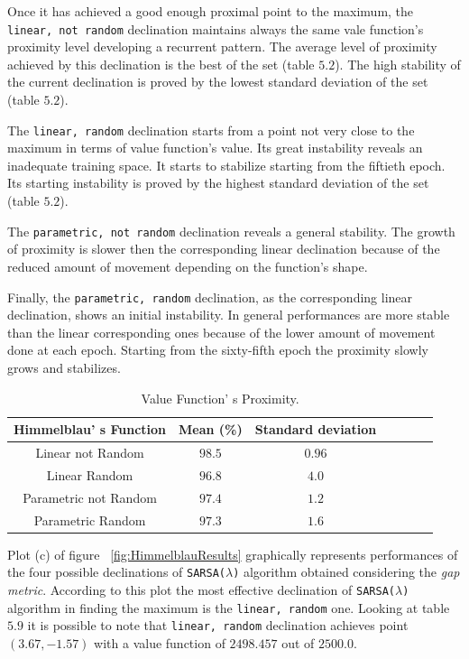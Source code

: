 Once it has achieved a good enough proximal point to the maximum, the {\tt linear, not random} declination maintains always the same vale function's proximity level developing a recurrent pattern. The average level of proximity achieved by this declination is the best of the set (table $5.2$). The high stability of the current declination is proved by the lowest standard deviation of the set (table $5.2$). 

The {\tt linear, random} declination starts from a point not very close to the maximum in terms of value function's value. Its great instability reveals an inadequate training space. It starts to stabilize starting from the fiftieth epoch. Its starting instability is proved by the highest standard deviation of the set (table $5.2$).

The {\tt parametric, not random} declination reveals a general stability. The growth of proximity is slower then the corresponding linear declination because of the reduced amount of movement depending on the function's shape. 

Finally, the {\tt parametric, random} declination, as the corresponding linear declination, shows an initial instability. In general performances are more stable than the linear corresponding ones because of the lower amount of movement done at each epoch. Starting from the sixty-fifth epoch the proximity slowly grows and stabilizes. \\

\begin{table} [h!]
	\centering
	\resizebox{\linewidth}{!} {
	\begin{tabular}{c| cccccc} 
		\hline \textbf{Himmelblau' s Function}
		& \textbf{Mean (\%)} & \textbf{Standard deviation}  \\ 
		\hline Linear not Random
		& \cellcolor{green!25}$98.5$ & \cellcolor{green!25}$0.96$  \\ 
		\hline Linear Random
		& $96.8$ & $4.0$ \\ 
		\hline Parametric not Random
		& $97.4$ & $1.2$ \\ 
		\hline Parametric Random
		& $97.3$ & $1.6$ \\ 
		\hline 
	\end{tabular}
}
\label{HimmelblauTabProximity}
\caption{Value Function' s Proximity.} 
\end{table}

Plot (c) of figure ~\ref{fig:HimmelblauResults} graphically represents performances of the four possible declinations of {\tt SARSA($\lambda$)} algorithm obtained considering the \textit{gap metric}. According to this plot the most effective declination of {\tt SARSA($\lambda$)} algorithm in finding the maximum is the {\tt linear, random} one. Looking at table $5.9$ it is possible to note that {\tt linear, random} declination achieves point $(3.67, -1.57)$ with a value function of $2498.457$ out of $2500.0$.

